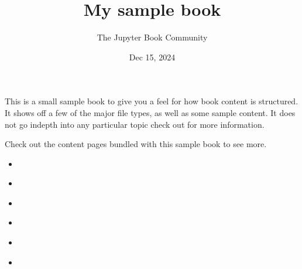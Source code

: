\documentclass[letterpaper,10pt,english]{jupyterBook}
\title{My sample book}
\date{Dec 15, 2024}
\author{The Jupyter Book Community}
\begin{document}
	
	\pagestyle{empty}
	\sphinxmaketitle
	\pagestyle{plain}
	\sphinxtableofcontents
	\pagestyle{normal}
	\label{\detokenize{intro::doc}}
	
	
	\sphinxAtStartPar
	This is a small sample book to give you a feel for how book content is
	structured.
	It shows off a few of the major file types, as well as some sample content.
	It does not go in\sphinxhyphen{}depth into any particular topic \sphinxhyphen{} check out  for more information.
	
	\sphinxAtStartPar
	Check out the content pages bundled with this sample book to see more.
	\begin{itemize}
		\item {} 
		\sphinxAtStartPar
		{\hyperref[\detokenize{0 Abstract::doc}]{}}
		
		\item {} 
		\sphinxAtStartPar
		{\hyperref[\detokenize{1 Introduction::doc}]{}}
		
		\item {} 
		\sphinxAtStartPar
		{\hyperref[\detokenize{2 Fabrication and Microstructure::doc}]{}}
		
		\item {} 
		\sphinxAtStartPar
		{\hyperref[\detokenize{3 Thermophysical Properties::doc}]{}}
		
		\item {} 
		\sphinxAtStartPar
		{\hyperref[\detokenize{4 Mechanical Properties::doc}]{}}
		
		\item {} 
		\sphinxAtStartPar
		{\hyperref[\detokenize{5 Radiation Effects on Mechanical Properties::doc}]{}}
		
	\end{itemize}
	
	\sphinxstepscope
	
	
\end{document}

